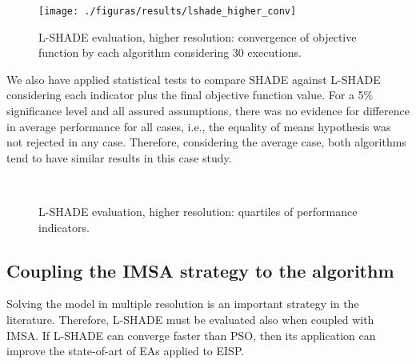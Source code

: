 			\begin{figure}
				\centering
				\texttt{[image: ./figuras/results/lshade\_higher\_conv]}
				\caption[L-SHADE evaluation, higher resolution: convergence.]{L-SHADE evaluation, higher resolution: convergence of objective function by each algorithm considering 30 executions.}
				\label{fig:results:lshade:higher:convergence}
			\end{figure}
		
			We also have applied statistical tests to compare SHADE against L-SHADE considering each indicator plus the final objective function value. For a 5\% significance level and all assured assumptions, there was no evidence for difference in average performance for all cases, i.e., the equality of means hypothesis was not rejected in any case. Therefore, considering the average case, both algorithms tend to have similar results in this case study. 
		
			\begin{figure}
				\centering
				 \\
				\caption[L-SHADE evaluation, higher resolution: indicators.]{L-SHADE evaluation, higher resolution: quartiles of performance indicators.}
				\label{fig:results:lshade:higher:indicators}
			\end{figure}
		
		\subsection{Coupling the IMSA strategy to the algorithm}\label{chap:results:lshade:imsa}
		
			Solving the model in multiple resolution is an important strategy in the literature. Therefore, L-SHADE must be evaluated also when coupled with IMSA. If L-SHADE can converge faster than PSO, then its application can improve the state-of-art of EAs applied to EISP.
			
